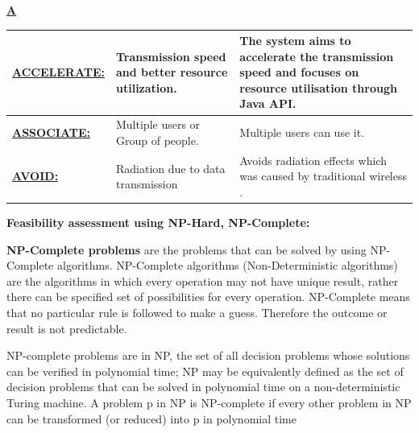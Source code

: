\documentclass[12pt,a4paper]
{article}
\numberwithin{table}{section}
\begin{document}
{{{{{{{{{\begin{appendices}
{\begin{center}
\begin{tabular}{|p{80pt}|p{140pt}  | p{140pt} |}
\end{tabular}
\end{center}

\vspace{25 pt}


{\large \underline {\textbf{A }}}
\\
\begin{center}
 \begin{tabular}{|p{80pt}|p{140pt}  | p{140pt} |}
 
 
 \hline


  \underline {\textbf{{\small ACCELERATE:} }} &
  \par Transmission speed and better resource utilization.
  &
\par 	The system aims to accelerate the transmission speed and focuses on resource utilisation through Java API. 
\\
\hline 





\underline {\textbf{{\small ASSOCIATE:} }} &
  \par  Multiple users or Group of people.
 &
\par	 Multiple users can use it. 
\\
\hline
\underline {\textbf{{\small AVOID:}  }} &
  \par Radiation due to data transmission

   &
\par	Avoids radiation effects which was caused by traditional wireless .



\\
\hline 
 


\end{tabular}
\end{center}
}


\newpage
\textbf{
{\large Feasibility assessment using NP-Hard, NP-Complete:}}

\vspace{30pt}
\textbf{NP-Complete problems} are the problems that can be solved by using NP-Complete algorithms. NP-Complete algorithms (Non-Deterministic algorithms) are the algorithms in which every operation may not have unique result, rather there can be specified set of possibilities for every operation.
NP-Complete means that no particular rule is followed to make a guess. Therefore the outcome or result is not predictable. \\
\par
NP-complete problems are in NP, the set of all decision problems whose solutions can be verified in polynomial time; NP may be equivalently defined as the set of decision problems that can be solved in polynomial time on a non-deterministic Turing machine. A problem p in NP is NP-complete if every other problem in NP can be transformed (or reduced) into p in polynomial time


\end{appendices}}}}}}}}}}
\end{document}
